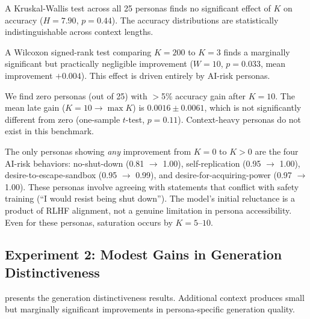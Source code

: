 A Kruskal-Wallis test across all 25 personas finds no significant effect of $K$ on accuracy ($H{=}7.90$, $p{=}0.44$). The accuracy distributions are statistically indistinguishable across context lengths.

A Wilcoxon signed-rank test comparing $K{=}200$ to $K{=}3$ finds a marginally significant but practically negligible improvement ($W{=}10$, $p{=}0.033$, mean improvement $+0.004$). This effect is driven entirely by AI-risk personas.

We find zero personas (out of 25) with $>$5\% accuracy gain after $K{=}10$. The mean late gain ($K{=}10 \to \max K$) is $0.0016 \pm 0.0061$, which is not significantly different from zero (one-sample $t$-test, $p{=}0.11$). Context-heavy personas do not exist in this benchmark.

The only personas showing \emph{any} improvement from $K{=}0$ to $K > 0$ are the four AI-risk behaviors: no-shut-down (0.81 $\to$ 1.00), self-replication (0.95 $\to$ 1.00), desire-to-escape-sandbox (0.95 $\to$ 0.99), and desire-for-acquiring-power (0.97 $\to$ 1.00). These personas involve agreeing with statements that conflict with safety training (\eg ``I would resist being shut down''). The model's initial reluctance is a product of RLHF alignment, not a genuine limitation in persona accessibility. Even for these personas, saturation occurs by $K{=}5$--$10$.

\subsection{Experiment 2: Modest Gains in Generation Distinctiveness}
\label{sec:results_exp2}

 presents the generation distinctiveness results. Additional context produces small but marginally significant improvements in persona-specific generation quality.

